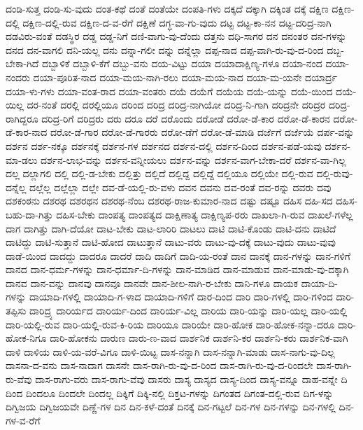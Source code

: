 {ದಂಡಿ-ಸುತ್ತ
ದಂಡಿ-ಸು-ವುದು
ದಂತ-ಕಥೆ
ದಂತೆ
ದಂತೆಯೇ
ದಂಪತಿ-ಗಳು
ದಕ್ಕದೆ
ದಕ್ಕಾಗಿ
ದಕ್ಕಿಂತ
ದಕ್ಕೆ
ದಕ್ಷಿಣ
ದಕ್ಷಿಣ-ದಲ್ಲಿ
ದಕ್ಷಿಣ-ದಲ್ಲಿ-ರುವ
ದಕ್ಷಿಣ-ದ-ವ-ರೆಗೆ
ದಕ್ಷಿಣೆ
ದಗ್ಧ-ವಾ-ಗು-ವುದು
ದಟ್ಟ
ದಟ್ಟ-ಕಾ-ನನ
ದಟ್ಟ-ದರಿದ್ರ-ನಾಗಿ
ದಡವಿರು-ವಂತೆ
ದಡಸ್ಥಿರ
ದಡ್ಡ
ದಡ್ಡ-ನಿಗೆ
ದಣಿ-ವಾಗು-ವು-ದೆಂದು
ದತ್ತನು
ದಧಿ-ಸಾಗರ
ದನ
ದನಂತರ
ದನ-ಗಳನ್ನು
ದನದ
ದನ-ವಾಗಲಿ
ದನಿ-ಯಲ್ಲ
ದನು
ದನ್ನಾ-ಗಲೀ
ದನ್ನು
ದನ್ನೆಲ್ಲಾ
ದಪ್ಪ-ನಾದ
ದಪ್ಪ-ವಾಗಿ-ರು-ವು-ದ-ರಿಂದ
ದಬ್ಬ-ಬೇಕಾ-ಗಿದೆ
ದಬ್ಬಾಳಿಕೆ
ದಬ್ಬಾಳಿ-ಕೆಗೆ
ದಬ್ಬು-ವನು
ದಯ-ವಿಟ್ಟು
ದಯಾ
ದಯಾದಾಕ್ಷಿಣ್ಯ-ಗಳೂ
ದಯಾ-ನಂದ
ದಯಾ-ನಂದರು
ದಯಾ-ಪೂರಿತ-ನಾದ
ದಯಾ-ಮಯ-ನಾಗಿ-ರಲು
ದಯಾ-ಮಯ-ನಾದ
ದಯಾ-ಮ-ಯನೇ
ದಯಾರ್ದ್ರ
ದಯಾ-ಳು-ಗಳು
ದಯಾ-ವಂತ-ರಾದ
ದಯಾ-ವಂತರು
ದಯೆ
ದಯೆಗೆ
ದಯೆಯ
ದಯೆ-ಯನ್ನು
ದಯೆ-ಯಿಂದ
ದಯೆ-ಯಿಲ್ಲ
ದರ-ನಂತೆ
ದರಲ್ಲಿ
ದರಲ್ಲಿಯೂ
ದರಿಂದ
ದರಿದ್ರ
ದರಿದ್ರ-ನಾಗಿಯೋ
ದರಿದ್ರ-ನಿ-ಗಾಗಿ
ದರಿದ್ರನೇ
ದರಿದ್ರರ
ದರಿದ್ರ-ರಾಗಿದ್ದರೂ
ದರಿದ್ರ-ರಿಗೆ
ದರಿದ್ರರು
ದರು
ದರೂ
ದರೆ
ದರೊಂದು
ದರೋಡೆ
ದರೋ-ಡೆ-ಕಾರ
ದರೋ-ಡೆ-ಕಾರನ
ದರೋ-ಡೆ-ಕಾರ-ನಾದ
ದರೋ-ಡೆ-ಗಾರ
ದರೋ-ಡೆ-ಗಾರರು
ದರೋ-ಡೆಗೆ
ದರೋ-ಡೆ-ಮಾಡಿ
ದರ್ಜೆಗೆ
ದರ್ಜೆಯೆ
ದರ್ಪ-ವನ್ನು
ದರ್ಶನ
ದರ್ಶ-ನಕ್ಕೂ
ದರ್ಶನಕ್ಕೆ
ದರ್ಶನ-ಗಳ
ದರ್ಶನದ
ದರ್ಶನ-ದಲ್ಲಿ
ದರ್ಶನ-ದಿಂದ
ದರ್ಶನ-ಪಡೆ-ಯವು
ದರ್ಶನ-ಮಾ-ಡಲು
ದರ್ಶನ-ಲಾಭ-ವನ್ನು
ದರ್ಶನ-ವನ್ನೀಯಲು
ದರ್ಶನ-ವನ್ನು
ದರ್ಶನ-ವಾಗ-ಬೇಕಾ-ದರೆ
ದರ್ಶನ-ವಾ-ಗಿಲ್ಲ
ದಲ್ಲ
ದಲ್ಲಾಗಲಿ
ದಲ್ಲಿ
ದಲ್ಲಿ-ಡ-ಬೇಕು
ದಲ್ಲಿತ್ತು
ದಲ್ಲಿದೆ
ದಲ್ಲಿದ್ದ
ದಲ್ಲಿದ್ದೆ
ದಲ್ಲಿಯೂ
ದಲ್ಲಿಯೇ
ದಲ್ಲಿ-ರುವ
ದಲ್ಲಿ-ರುವು-ದನ್ನೆಲ್ಲ
ದಲ್ಲೆಲ್ಲ
ದಲ್ಲೆಲ್ಲಾ
ದಲ್ಲೇ
ದವ-ಡೆ-ಯಲ್ಲಿ-ರು-ವಳು
ದವನ
ದವನು
ದವ-ರಂತೆ
ದವ-ರನ್ನು
ದವರು
ದವು
ದಶಕಂಠನು
ದಶರಥ
ದಶರಥನ
ದಶರಥ-ನೆಂಬ
ದಶರಥ-ರಾಜ-ಕುಮಾರ-ನಾದ
ದಷ್ಟು
ದಷ್ಟೂ
ದಹಿಸ
ದಹಿ-ಸದ
ದಹಿಸ-ಬಹು-ದಾ-ಗಿತ್ತು
ದಹಿಸ-ಬೇಕು
ದಾಂಪತ್ಯ
ದಾಂಪತ್ಯದ
ದಾಕ್ಷಿಣಾತ್ಯ
ದಾಕ್ಷಿಣ್ಯಪ-ರರು
ದಾಖಲಾ-ಗಿ-ರುವ
ದಾಖಲೆ-ಗಳೆಲ್ಲ
ದಾಗ
ದಾಗಿತ್ತು
ದಾಗಿ-ದೆಯೋ
ದಾಟ-ಬೇಕು
ದಾಟ-ಲಾರಿರಿ
ದಾಟಲು
ದಾಟಿ
ದಾಟಿ-ಕೊಂಡು
ದಾಟಿ-ದನು
ದಾಟಿದೆ
ದಾಟಿದ್ದು
ದಾಟಿ-ಸುತ್ತಾನೆ
ದಾಟಿ-ಹೋದ
ದಾಟುತ್ತಾನೆ
ದಾಟು-ವರು
ದಾಟು-ವು-ದಕ್ಕೆ
ದಾಟು-ವುದು
ದಾಟು-ವುವು
ದಾಡೆ-ಯಿಂದ
ದಾದದ್ದು
ದಾದರೂ
ದಾದರೆ
ದಾದಿ
ದಾದಿಗೆ
ದಾದಿ-ಯ-ರಂತೆ
ದಾನ
ದಾನಕ್ಕೆ
ದಾನ-ಗಳನ್ನು
ದಾನ-ಗಳಿಗೆ
ದಾನದ
ದಾನ-ಧರ್ಮ-ಗಳನ್ನು
ದಾನ-ಧರ್ಮಾ-ದಿ-ಗಳನ್ನು
ದಾನ-ಮಾಡಿದ
ದಾನ-ಮಾಡುವ
ದಾನ-ಮಾಡು-ವು-ದಕ್ಕಾಗಿ
ದಾನವ
ದಾನ-ವನ್ನು
ದಾನವು
ದಾನವೂ
ದಾನವೇ
ದಾನ-ಶೀಲ-ನಾಗಿ-ರ-ಬೇಕು
ದಾನಿ-ಗಳೂ
ದಾಯಕ
ದಾಯಾ-ದಿ-ಗಳನ್ನು
ದಾಯಾದಿ-ಗಳಲ್ಲಿ
ದಾಯಾದಿ-ಗ-ಳಾದ
ದಾಯಾದಿ-ಗಳಿಗೆ
ದಾರ-ದಿಂದ
ದಾರಿ
ದಾರಿ-ಗಳಲ್ಲಿ
ದಾರಿ-ಗಳಿಂದ
ದಾರಿ-ತಪ್ಪಿಸು
ದಾರಿದ್ರ್ಯ
ದಾರಿರ್ಯದ
ದಾರಿರ್ಯ-ದಿಂದ
ದಾರಿರ್ಯ-ವಿಲ್ಲ
ದಾರಿಯ
ದಾರಿ-ಯನ್ನು
ದಾರಿ-ಯಲ್ಲ
ದಾರಿ-ಯಲ್ಲಿ
ದಾರಿ-ಯಲ್ಲಿ-ರುವ
ದಾರಿ-ಯಲ್ಲಿ-ರುವ-ಕಿ-ರಿಯ
ದಾರಿಯೂ
ದಾರಿಯೇ
ದಾರಿ-ಹೋಕ
ದಾರಿ-ಹೋಕ-ನನ್ನಾ-ದರೂ
ದಾರಿ-ಹೋಕ-ನಿಗೂ
ದಾರಿ-ಹೋಕನು
ದಾರುಣ
ದಾರು-ಣ-ವಾದ
ದಾರ್ಶನಿಕ
ದಾರ್ಶನಿ-ಕರ
ದಾರ್ಶನಿ-ಕರು
ದಾರ್ಶನಿಕ-ವಾಗಿ
ದಾಳಿ
ದಾಳಿಯ
ದಾಳಿ-ಯ-ವರೆ-ವಿಗೂ
ದಾಳಿ-ಯಿಟ್ಟ
ದಾಸ-ನನ್ನಾಗಿ
ದಾಸ-ನನ್ನಾಗಿ-ಮಾಡು
ದಾಸ-ನಾಗು-ವು-ದಿಲ್ಲ
ದಾಸನಾ-ದ-ವನು
ದಾಸ-ನಾದಾಗ
ದಾಸನೇ
ದಾಸ-ರಾಗಿ-ರು-ವು-ದ-ರಿಂದ
ದಾಸ-ರಾಗಿ-ರು-ವು-ದ-ರಿಂದಲೇ
ದಾಸ-ರಾಗಿ-ರು-ವೆವು
ದಾಸ-ರಾಗು-ವರು
ದಾಸ-ರಾಗು-ವೆವು
ದಾಸರು
ದಾಸ್ಯ
ದಾಸ್ಯದ
ದಾಸ್ಯ-ದಿಂದ
ದಾಸ್ಯ-ವನ್ನೂ
ದಾಹ-ವನ್ನೇ
ದಿ
ದಿಂದ
ದಿಂದಲೂ
ದಿಂದಲೇ
ದಿಂದಲ್ಲ
ದಿಕ್ಕಿಗೆ
ದಿಕ್ಕಿ-ನಲ್ಲಿ
ದಿಕ್ತಟ-ಗಳನ್ನು
ದಿಗಂತದ
ದಿಗಂತ-ದಲ್ಲಿ-ರುವ
ದಿಗ-ಳನ್ನು
ದಿಗ್ವಿಜಯ
ದಿಗ್ವಿಜಯವೇ
ದಿಣ್ಣೆ-ಗಳ
ದಿನ
ದಿನ-ಕಳೆ-ದಂತೆ
ದಿನಕ್ಕೆ
ದಿನ-ಗಟ್ಟಲೆ
ದಿನ-ಗಳ
ದಿನ-ಗಳನ್ನು
ದಿನ-ಗಳಲ್ಲಿ
ದಿನ-ಗಳ-ವ-ರೆಗೆ
}
